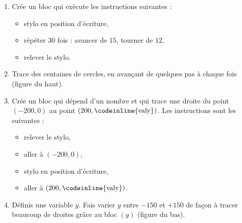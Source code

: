 \documentclass[class=report,crop=false, 12pt]{standalone}
\begin{document}
\begin{activite}
\begin{enumerate}
  \item Crée un bloc  qui exécute les instructions suivantes :
    \begin{itemize}
      \item stylo en position d'écriture,
      \item répéter $30$ fois : avancer de $15$, tourner de $12$\textdegree,
      \item relever le stylo.
    \end{itemize}  

  \item Trace des centaines de cercles, en avançant de quelques pas à chaque fois (figure du haut).
  
  \item Crée un bloc  qui dépend d'un nombre
  et qui trace une droite du point $(-200,0)$ au point $(200,\text{\codeinline{valy}})$. Les instructions sont les suivantes :
    \begin{itemize}      
      \item relever le stylo,
      \item aller à $(-200,0)$,
      \item stylo en position d'écriture,
      \item aller à $(200,\text{\codeinline{valy}})$.
    \end{itemize}   
  
  \item Définis une variable $y$. Fais varier $y$ entre $-150$ et $+150$ de façon à tracer beaucoup de droites grâce au bloc  $(y)$ (figure du bas).  
    
\end{enumerate}
  
\end{activite}
\end{document}
